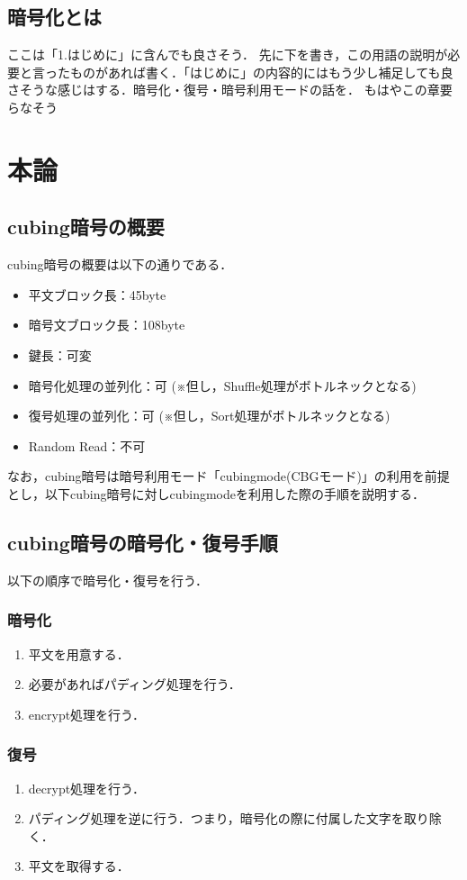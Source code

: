 \documentclass{jsarticle}
\begin{document}
\subsection{暗号化とは}
ここは「1.はじめに」に含んでも良さそう．
先に下を書き，この用語の説明が必要と言ったものがあれば書く．「はじめに」の内容的にはもう少し補足しても良さそうな感じはする．暗号化・復号・暗号利用モードの話を．
もはやこの章要らなそう

\section{本論}
\subsection{cubing暗号の概要}
cubing暗号の概要は以下の通りである．
\begin{itemize}
  \item 平文ブロック長：45byte
  \item 暗号文ブロック長：108byte
  \item 鍵長：可変
  \item 暗号化処理の並列化：可 (※但し，Shuffle処理がボトルネックとなる)
  \item 復号処理の並列化：可 (※但し，Sort処理がボトルネックとなる)
  \item Random Read：不可
\end{itemize}
なお，cubing暗号は暗号利用モード「cubingmode(CBGモード)」の利用を前提とし，以下cubing暗号に対しcubingmodeを利用した際の手順を説明する．
\subsection{cubing暗号の暗号化・復号手順}

以下の順序で暗号化・復号を行う．

\subsubsection{暗号化}
\begin{enumerate}
\item 平文を用意する．
\item 必要があればパディング処理を行う．
\item encrypt処理を行う．
\end{enumerate}

\subsubsection{復号}
\begin{enumerate}
\item decrypt処理を行う．
\item パディング処理を逆に行う．つまり，暗号化の際に付属した文字を取り除く．
\item 平文を取得する．
\end{enumerate}
\end{document}
